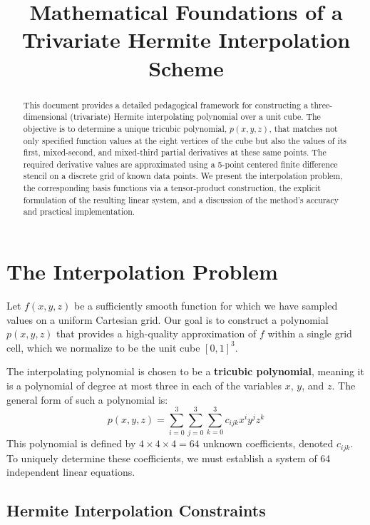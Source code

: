 \documentclass[12pt]{article}
\title{\textbf{Mathematical Foundations of a Trivariate Hermite Interpolation Scheme}}
\author{}
\date{}
\begin{document}
\maketitle

\begin{abstract}
This document provides a detailed pedagogical framework for constructing a three-dimensional (trivariate) Hermite interpolating polynomial over a unit cube. The objective is to determine a unique tricubic polynomial, $p(x, y, z)$, that matches not only specified function values at the eight vertices of the cube but also the values of its first, mixed-second, and mixed-third partial derivatives at these same points. The required derivative values are approximated using a 5-point centered finite difference stencil on a discrete grid of known data points. We present the interpolation problem, the corresponding basis functions via a tensor-product construction, the explicit formulation of the resulting linear system, and a discussion of the method's accuracy and practical implementation.
\end{abstract}

\tableofcontents

\section{The Interpolation Problem}

Let $f(x, y, z)$ be a sufficiently smooth function for which we have sampled values on a uniform Cartesian grid. Our goal is to construct a polynomial $p(x, y, z)$ that provides a high-quality approximation of $f$ within a single grid cell, which we normalize to be the unit cube $[0, 1]^3$.

The interpolating polynomial is chosen to be a \textbf{tricubic polynomial}, meaning it is a polynomial of degree at most three in each of the variables $x$, $y$, and $z$. The general form of such a polynomial is:
\begin{equation}
    p(x, y, z) = \sum_{i=0}^{3} \sum_{j=0}^{3} \sum_{k=0}^{3} c_{ijk} x^i y^j z^k
    \label{eq:poly_form}
\end{equation}
This polynomial is defined by $4 \times 4 \times 4 = 64$ unknown coefficients, denoted $c_{ijk}$. To uniquely determine these coefficients, we must establish a system of 64 independent linear equations.

\subsection{Hermite Interpolation Constraints}
\end{document}

